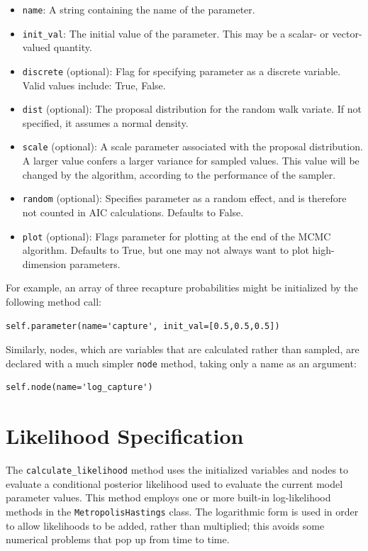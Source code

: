 \documentclass[]{book}
\begin{document}
\begin{itemize}

\item \verb=name=: A string containing the name of the parameter.
\item \verb=init_val=: The initial value of the parameter. This may be a scalar- or vector-valued quantity.
\item \verb=discrete= (optional): Flag for specifying parameter as a discrete variable. Valid values include: True, False.
\item \verb=dist= (optional): The proposal distribution for the random walk variate. If not specified, it assumes a normal density.
\item \verb=scale= (optional): A scale parameter associated with the proposal distribution. A larger value confers a larger variance for sampled values. This value will be changed by the algorithm, according to the performance of the sampler.
\item \verb=random= (optional): Specifies parameter as a random effect, and is therefore not counted in AIC calculations. Defaults to False.
\item \verb=plot= (optional): Flags parameter for plotting at the end of the MCMC algorithm. Defaults to True, but one may not always want to plot high-dimension parameters.
\end{itemize}
For example, an array of three recapture probabilities might be initialized by the following method call:
\begin{verbatim}
self.parameter(name='capture', init_val=[0.5,0.5,0.5])
\end{verbatim}

Similarly, nodes, which are variables that are calculated rather than sampled, are declared with a much simpler \verb=node= method, taking only a name as an argument:
\begin{verbatim}
self.node(name='log_capture')
\end{verbatim}

\section{Likelihood Specification}\label{sec:likelihood_specification}

The \verb=calculate_likelihood= method uses the initialized variables and nodes to evaluate a conditional posterior likelihood used to evaluate the current model parameter values. This method employs one or more built-in log-likelihood methods in the \verb=MetropolisHastings= class. The logarithmic form is used in order to allow likelihoods to be added, rather than multiplied; this avoids some numerical problems that pop up from time to time.
\end{document}
